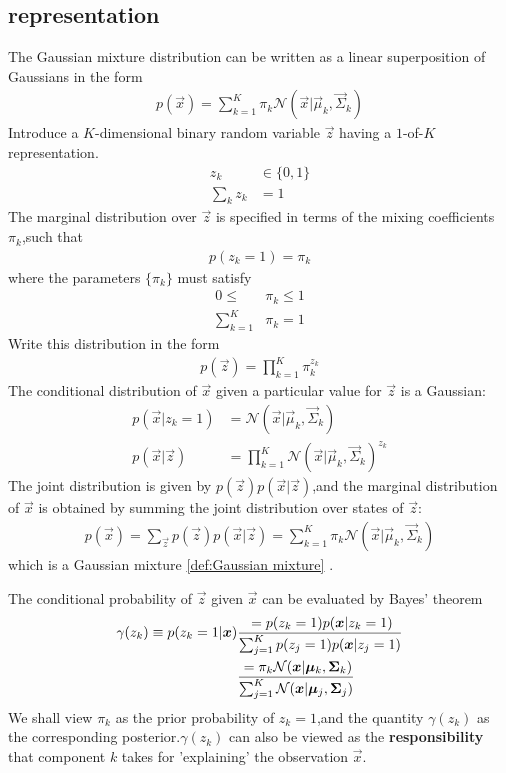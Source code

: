 \subsection{representation}
The Gaussian mixture distribution can be written as a linear superposition of Gaussians in the form
\begin{align}\label{def:Gaussian mixture}
p(\vec{x}) =
\sum_{k=1}^{K}\pi_k\mathcal{N}(\vec{x}|\vec{\mu}_k,\vec{\Sigma}_k)
\end{align}
Introduce a $K$-dimensional binary random variable $\vec{z}$ having a $1$-of-$K$ representation.
\begin{align}
z_k &\in \{ 0,1\} \\
\sum_k z_k &=1
\end{align}
The marginal distribution over $\vec{z}$ is specified in terms of the mixing coefficients $\pi_k$,such that
\begin{align}
p(z_k=1) = \pi_k
\end{align}
where the parameters $\{ \pi_k\}$ must satisfy
\begin{align}
0 \leq &\pi_k \leq 1\\
\sum_{k=1}^{K} &\pi_k = 1
\end{align}
Write this distribution in the form
\begin{align}
p(\vec{z}) = \prod_{k=1}^{K}\pi_k^{z_k}
\end{align}
The conditional distribution of $\vec{x}$ given a particular value for $\vec{z}$ is a Gaussian:
\begin{align}
p(\vec{x}|z_k=1) &= \mathcal{N}(\vec{x}|\vec{\mu}_k,\vec{\Sigma}_k) \\
p(\vec{x}|\vec{z}) 
&=\prod_{k=1}^{K}\mathcal{N}(\vec{x}|\vec{\mu}_k,\vec{\Sigma}_k)^{z_k}
\end{align}
The joint distribution is given by $p(\vec{z})p(\vec{x}|\vec{z})$,and the marginal distribution of $\vec{x}$ is obtained by summing the joint distribution over states of $\vec{z}$:
\begin{align}
p(\vec{x}) = \sum_{\vec{z}}{p(\vec{z})p(\vec{x}|\vec{z})} =
\sum_{k=1}^{K}\pi_k\mathcal{N}(\vec{x}|\vec{\mu}_k,\vec{\Sigma}_k)
\end{align}
which is a Gaussian mixture \ref{def:Gaussian mixture} .

The conditional probability of $\vec{z}$ given $\vec{x}$ can be evaluated by Bayes' theorem
\begin{align}
\gamma(z_k)\equiv p(z_k=1|\vec{x}) 
&=p(z_k=1)p(\vec{x}|z_k=1) \over \sum_{j=1}^{K}p(z_j=1)p(\vec{x}|z_j=1) \\
&=\pi_k \mathcal{N}(\vec{x}|\vec{\mu}_k,\vec{\Sigma}_k) \over 
	\sum_{j=1}^{K}\mathcal{N}(\vec{x}|\vec{\mu}_j,\vec{\Sigma}_j)
\end{align}
We shall view $\pi_k$ as the prior probability of $z_k=1$,and the quantity $\gamma(z_k)$ as the corresponding posterior.$\gamma(z_k)$ can also be viewed as the \textbf{responsibility} that component $k$ takes for 'explaining' the observation $\vec{x}$.


